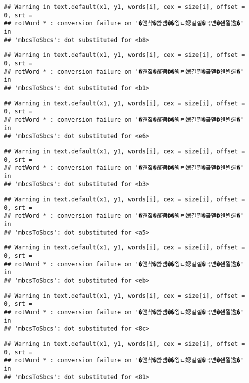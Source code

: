 \documentclass[]{article}
\begin{document}
\begin{verbatim}
## Warning in text.default(x1, y1, words[i], cex = size[i], offset = 0, srt =
## rotWord * : conversion failure on '�얜챸�뺞꽴��욍ㅌ媤길낄�곸몓�쇈묄逾�' in
## 'mbcsToSbcs': dot substituted for <b8>
\end{verbatim}

\begin{verbatim}
## Warning in text.default(x1, y1, words[i], cex = size[i], offset = 0, srt =
## rotWord * : conversion failure on '�얜챸�뺞꽴��욍ㅌ媤길낄�곸몓�쇈묄逾�' in
## 'mbcsToSbcs': dot substituted for <b1>
\end{verbatim}

\begin{verbatim}
## Warning in text.default(x1, y1, words[i], cex = size[i], offset = 0, srt =
## rotWord * : conversion failure on '�얜챸�뺞꽴��욍ㅌ媤길낄�곸몓�쇈묄逾�' in
## 'mbcsToSbcs': dot substituted for <e6>
\end{verbatim}

\begin{verbatim}
## Warning in text.default(x1, y1, words[i], cex = size[i], offset = 0, srt =
## rotWord * : conversion failure on '�얜챸�뺞꽴��욍ㅌ媤길낄�곸몓�쇈묄逾�' in
## 'mbcsToSbcs': dot substituted for <b3>
\end{verbatim}

\begin{verbatim}
## Warning in text.default(x1, y1, words[i], cex = size[i], offset = 0, srt =
## rotWord * : conversion failure on '�얜챸�뺞꽴��욍ㅌ媤길낄�곸몓�쇈묄逾�' in
## 'mbcsToSbcs': dot substituted for <a5>
\end{verbatim}

\begin{verbatim}
## Warning in text.default(x1, y1, words[i], cex = size[i], offset = 0, srt =
## rotWord * : conversion failure on '�얜챸�뺞꽴��욍ㅌ媤길낄�곸몓�쇈묄逾�' in
## 'mbcsToSbcs': dot substituted for <eb>
\end{verbatim}

\begin{verbatim}
## Warning in text.default(x1, y1, words[i], cex = size[i], offset = 0, srt =
## rotWord * : conversion failure on '�얜챸�뺞꽴��욍ㅌ媤길낄�곸몓�쇈묄逾�' in
## 'mbcsToSbcs': dot substituted for <8c>
\end{verbatim}

\begin{verbatim}
## Warning in text.default(x1, y1, words[i], cex = size[i], offset = 0, srt =
## rotWord * : conversion failure on '�얜챸�뺞꽴��욍ㅌ媤길낄�곸몓�쇈묄逾�' in
## 'mbcsToSbcs': dot substituted for <81>
\end{verbatim}
\end{document}
